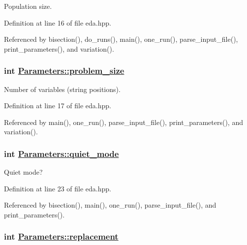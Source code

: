 Population size. 



Definition at line 16 of file eda.hpp.

Referenced by bisection(), do\_\-runs(), main(), one\_\-run(), parse\_\-input\_\-file(), print\_\-parameters(), and variation().\hypertarget{struct_parameters_451e60ea6b3d784e1093ca2a475ccec9}{
\subsubsection[problem\_\-size]{\setlength{\rightskip}{0pt plus 5cm}int \hyperlink{struct_parameters_451e60ea6b3d784e1093ca2a475ccec9}{Parameters::problem\_\-size}}}
\label{struct_parameters_451e60ea6b3d784e1093ca2a475ccec9}


Number of variables (string positions). 



Definition at line 17 of file eda.hpp.

Referenced by main(), one\_\-run(), parse\_\-input\_\-file(), print\_\-parameters(), and variation().\hypertarget{struct_parameters_7c7a2312e852e436931e2ce6f6f082d2}{
\subsubsection[quiet\_\-mode]{\setlength{\rightskip}{0pt plus 5cm}int \hyperlink{struct_parameters_7c7a2312e852e436931e2ce6f6f082d2}{Parameters::quiet\_\-mode}}}
\label{struct_parameters_7c7a2312e852e436931e2ce6f6f082d2}


Quiet mode? 



Definition at line 23 of file eda.hpp.

Referenced by bisection(), main(), one\_\-run(), parse\_\-input\_\-file(), and print\_\-parameters().\hypertarget{struct_parameters_64e0afb8fed55d4ede2af277ad258d42}{
\subsubsection[replacement]{\setlength{\rightskip}{0pt plus 5cm}int \hyperlink{struct_parameters_64e0afb8fed55d4ede2af277ad258d42}{Parameters::replacement}}}
\label{struct_parameters_64e0afb8fed55d4ede2af277ad258d42}


